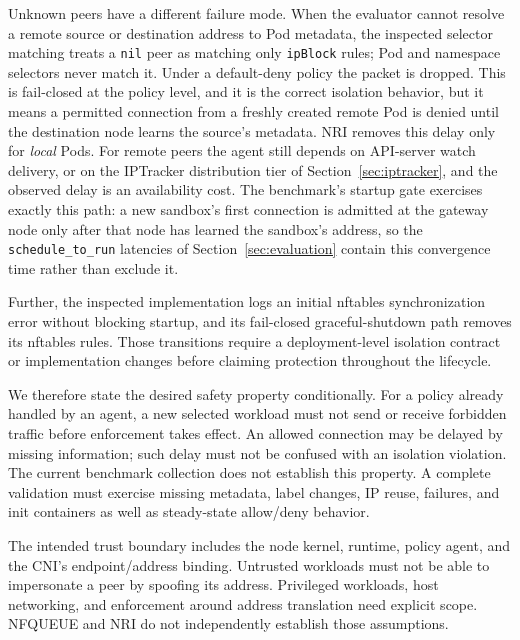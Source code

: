 \documentclass[letterpaper,twocolumn,10pt]{article}
\begin{document}
Unknown peers have a different failure mode. When the evaluator cannot
resolve a remote source or destination address to Pod metadata, the
inspected selector matching treats a \texttt{nil} peer as matching only
\texttt{ipBlock} rules; Pod and namespace selectors never match it. Under
a default-deny policy the packet is dropped. This is fail-closed at the
policy level, and it is the correct isolation behavior, but it means a
permitted connection from a freshly created remote Pod is denied until
the destination node learns the source's metadata. NRI removes this
delay only for \emph{local} Pods. For remote peers the agent still
depends on API-server watch delivery, or on the IPTracker distribution
tier of Section~\ref{sec:iptracker}, and the observed delay is an
availability cost. The benchmark's startup gate exercises exactly this
path: a new sandbox's first connection is admitted at the gateway node
only after that node has learned the sandbox's address, so the
\texttt{schedule\_to\_run} latencies of Section~\ref{sec:evaluation}
contain this convergence time rather than exclude it.

Further, the inspected implementation logs an initial nftables
synchronization error without blocking startup, and its fail-closed
graceful-shutdown path removes its nftables rules. Those transitions
require a deployment-level isolation contract or implementation changes
before claiming protection throughout the lifecycle.

We therefore state the desired safety property conditionally. For a
policy already handled by an agent, a new selected workload must not
send or receive forbidden traffic before enforcement takes effect.
An allowed connection may be delayed by missing information; such delay
must not be confused with an isolation violation. The current benchmark
collection does not establish this property. A complete validation must
exercise missing metadata, label changes, IP reuse, failures, and init
containers as well as steady-state allow/deny behavior.

The intended trust boundary includes the node kernel, runtime, policy
agent, and the CNI's endpoint/address binding. Untrusted workloads must
not be able to impersonate a peer by spoofing its address. Privileged
workloads, host networking, and enforcement around address translation
need explicit scope. NFQUEUE and NRI do not independently establish
those assumptions.
\end{document}
